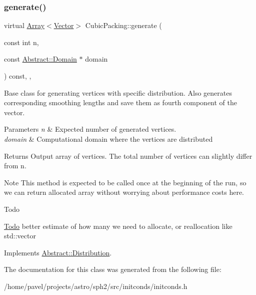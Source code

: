 \subsubsection{\texorpdfstring{generate()}{generate()}}
{\footnotesize\ttfamily virtual \hyperlink{classArray}{Array}$<$\hyperlink{classBasicVector}{Vector}$>$ Cubic\+Packing\+::generate (\begin{DoxyParamCaption}\item[{const int}]{n,  }\item[{const \hyperlink{classAbstract_1_1Domain}{Abstract\+::\+Domain} $\ast$}]{domain }\end{DoxyParamCaption}) const\hspace{0.3cm}{\ttfamily [inline]}, {\ttfamily [override]}, {\ttfamily [virtual]}}

Base class for generating vertices with specific distribution. Also generates corresponding smoothing lengths and save them as fourth component of the vector. 
\begin{DoxyParams}{Parameters}
{\em n} & Expected number of generated vertices. \\
\hline
{\em domain} & Computational domain where the vertices are distributed \\
\hline
\end{DoxyParams}
\begin{DoxyReturn}{Returns}
Output array of vertices. The total number of vertices can slightly differ from n. 
\end{DoxyReturn}
\begin{DoxyNote}{Note}
This method is expected to be called once at the beginning of the run, so we can return allocated array without worrying about performance costs here. 
\end{DoxyNote}
\begin{DoxyRefDesc}{Todo}
\item[\hyperlink{todo__todo000013}{Todo}]better estimate of how many we need to allocate, or reallocation like std\+::vector \end{DoxyRefDesc}


Implements \hyperlink{classAbstract_1_1Distribution_aefb835b4c4d2d0a5f864bc2cee0492b2}{Abstract\+::\+Distribution}.



The documentation for this class was generated from the following file\+:\begin{DoxyCompactItemize}
\item 
/home/pavel/projects/astro/sph2/src/initconds/initconds.\+h\end{DoxyCompactItemize}
